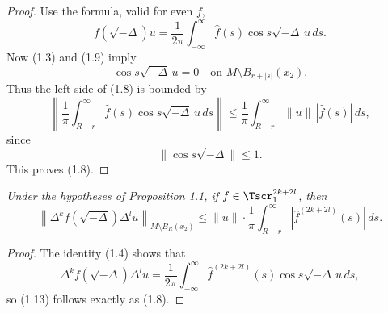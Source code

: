 \begin{proof}
Use the formula, valid for even $f$,
\begin{equation}\tag{1.10}
f(\sqrt{-\Delta})u = \frac{1}{2\pi} \int_{-\infty}^{\infty} \hat{f}(s)\cos s\sqrt{-\Delta}\,u\,ds.
\end{equation}
Now (1.3) and (1.9) imply
\begin{equation}\tag{1.11}
\cos s\sqrt{-\Delta}\,u = 0 \quad \text{on } M \setminus B_{r+|s|}(x_2).
\end{equation}
Thus the left side of (1.8) is bounded by
\[
\left\| \frac{1}{\pi} \int_{R-r}^{\infty} \hat{f}(s)\cos s\sqrt{-\Delta}\,u\,ds \right\|
\leq \frac{1}{\pi} \int_{R-r}^{\infty} \|u\|\,|\hat{f}(s)|\,ds,
\]
since
\begin{equation}\tag{1.12}
\|\cos s\sqrt{-\Delta}\| \leq 1.
\end{equation}
This proves (1.8).
\end{proof}

\begin{corollary}
\label{cor:derivative-tail-estimate}

\textit{Under the hypotheses of Proposition 1.1, if $f \in \Tscr_1^{2k+2l}$, then}
\begin{equation}\tag{1.13}
\left\| \Delta^k f(\sqrt{-\Delta}) \Delta^l u \right\|_{M \setminus B_R(x_2)}
\leq \|u\| \cdot \frac{1}{\pi} \int_{R-r}^{\infty} \left|\hat{f}^{(2k+2l)}(s)\right|\, ds.
\end{equation}
\end{corollary}

\begin{proof}
The identity (1.4) shows that
\begin{equation}\tag{1.14}
\Delta^k f(\sqrt{-\Delta}) \Delta^l u
= \frac{1}{2\pi} \int_{-\infty}^{\infty} \hat{f}^{(2k+2l)}(s)\cos s\sqrt{-\Delta}\,u\,ds,
\end{equation}
so (1.13) follows exactly as (1.8).
\end{proof}

